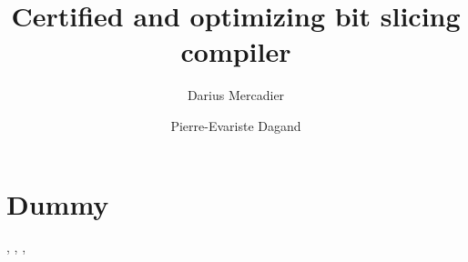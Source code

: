 \documentclass[a4paper]{report}
\title{Certified and optimizing bit slicing compiler}
\author{Darius Mercadier
\and Pierre-Evariste Dagand}
\begin{document}
\maketitle
\newpage

\section{Dummy}
\cite{Biham1997}, \cite{eprint-2000-11395}, \cite{thomaspornin2001}, \cite{randallfisher1997}




\end{document}

